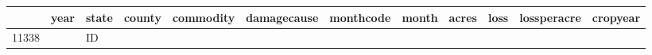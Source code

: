 \documentclass[]{article}
\begin{document}
\begin{longtable}[]{@{}lrllllrlrrrr@{}}
\toprule
\begin{minipage}[b]{0.04\columnwidth}\raggedright
\strut
\end{minipage} & \begin{minipage}[b]{0.03\columnwidth}\raggedleft
year\strut
\end{minipage} & \begin{minipage}[b]{0.04\columnwidth}\raggedright
state\strut
\end{minipage} & \begin{minipage}[b]{0.05\columnwidth}\raggedright
county\strut
\end{minipage} & \begin{minipage}[b]{0.10\columnwidth}\raggedright
commodity\strut
\end{minipage} & \begin{minipage}[b]{0.10\columnwidth}\raggedright
damagecause\strut
\end{minipage} & \begin{minipage}[b]{0.06\columnwidth}\raggedleft
monthcode\strut
\end{minipage} & \begin{minipage}[b]{0.04\columnwidth}\raggedright
month\strut
\end{minipage} & \begin{minipage}[b]{0.06\columnwidth}\raggedleft
acres\strut
\end{minipage} & \begin{minipage}[b]{0.06\columnwidth}\raggedleft
loss\strut
\end{minipage} & \begin{minipage}[b]{0.07\columnwidth}\raggedleft
lossperacre\strut
\end{minipage} & \begin{minipage}[b]{0.06\columnwidth}\raggedleft
cropyear\strut
\end{minipage}\tabularnewline
\midrule
\endhead
\begin{minipage}[t]{0.04\columnwidth}\raggedright
11338\strut
\end{minipage} & \begin{minipage}[t]{0.03\columnwidth}\raggedleft
2001\strut
\end{minipage} & \begin{minipage}[t]{0.04\columnwidth}\raggedright
ID\strut
\end{minipage} & \begin{minipage}[t]{0.05\columnwidth}\raggedright

\end{minipage}
\end{longtable}
\end{document}
